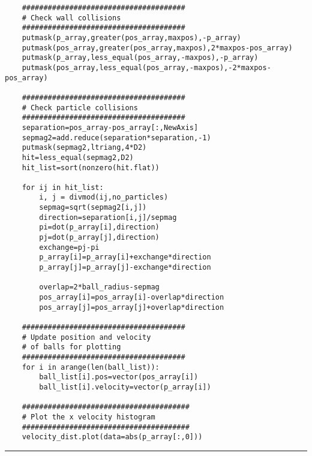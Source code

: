 \documentclass[a4]{article}
\begin{document}
{\begin{verbatim}
    ######################################
    # Check wall collisions
    ######################################
    putmask(p_array,greater(pos_array,maxpos),-p_array)
    putmask(pos_array,greater(pos_array,maxpos),2*maxpos-pos_array)
    putmask(p_array,less_equal(pos_array,-maxpos),-p_array)
    putmask(pos_array,less_equal(pos_array,-maxpos),-2*maxpos-pos_array)

    ######################################
    # Check particle collisions
    ######################################
    separation=pos_array-pos_array[:,NewAxis]
    sepmag2=add.reduce(separation*separation,-1)
    putmask(sepmag2,ltriang,4*D2)
    hit=less_equal(sepmag2,D2)
    hit_list=sort(nonzero(hit.flat))

    for ij in hit_list:
        i, j = divmod(ij,no_particles)
        sepmag=sqrt(sepmag2[i,j])
        direction=separation[i,j]/sepmag
        pi=dot(p_array[i],direction)
        pj=dot(p_array[j],direction)
        exchange=pj-pi
        p_array[i]=p_array[i]+exchange*direction
        p_array[j]=p_array[j]-exchange*direction

        overlap=2*ball_radius-sepmag
        pos_array[i]=pos_array[i]-overlap*direction
        pos_array[j]=pos_array[j]+overlap*direction

    ######################################
    # Update position and velocity
    # of balls for plotting
    ######################################
    for i in arange(len(ball_list)):
        ball_list[i].pos=vector(pos_array[i])
        ball_list[i].velocity=vector(p_array[i])

    #######################################
    # Plot the x velocity histogram
    #######################################
    velocity_dist.plot(data=abs(p_array[:,0]))
\end{verbatim}\hrule}

\end{document}
